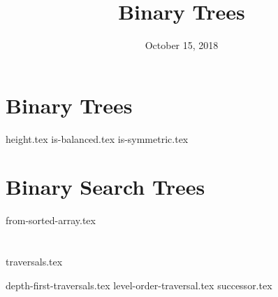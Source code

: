 \documentclass[11pt]{exam}
\title{Binary Trees}
\date{October 15, 2018}
\begin{document}
\maketitle

\section{Binary Trees}
\begin{questions}
{height.tex}
{is-balanced.tex}
\clearpage
{}\vspace*{-2em}
{is-symmetric.tex}
\end{questions}

\clearpage

\section{Binary Search Trees}
\begin{questions}
{from-sorted-array.tex}
\end{questions}

\clearpage

\section{}
{traversals.tex}
\begin{questions}
{depth-first-traversals.tex}
{level-order-traversal.tex}
{successor.tex}
\end{questions}
\end{document}
